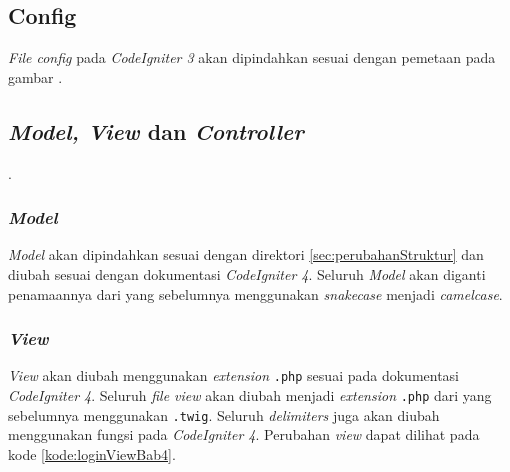 \subsection{Config}
\textit{File config} pada \textit{CodeIgniter 3} akan dipindahkan sesuai dengan pemetaan pada gambar .
\subsection{\textit{Model, View} dan \textit{Controller}}.
\subsubsection{\textit{Model}}
\textit{Model} akan dipindahkan sesuai dengan direktori \ref{sec:perubahanStruktur} dan diubah sesuai dengan dokumentasi \textit{CodeIgniter 4}. Seluruh \textit{Model} akan diganti penamaannya dari yang sebelumnya menggunakan \textit{snakecase} menjadi \textit{camelcase}.

\subsubsection{\textit{View}}
\textit{View} akan diubah menggunakan \textit{extension} \texttt{.php} sesuai pada dokumentasi \textit{CodeIgniter 4}. Seluruh \textit{file view} akan diubah menjadi \textit{extension} \texttt{.php} dari yang sebelumnya menggunakan \texttt{.twig}. Seluruh \textit{delimiters} juga akan diubah menggunakan fungsi pada \textit{CodeIgniter 4}. Perubahan \textit{view} dapat dilihat pada kode \ref{kode:loginViewBab4}.

